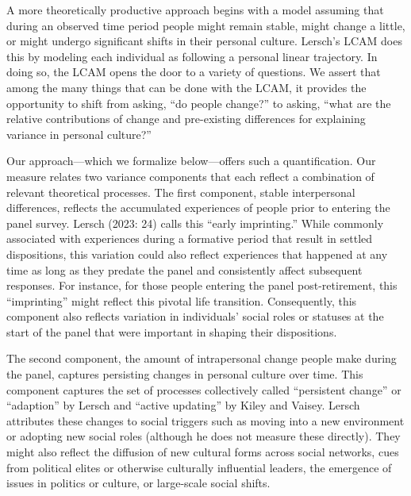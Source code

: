 \documentclass[
  11pt,
]{article}
\begin{document}
A more theoretically productive approach begins with a model assuming
that during an observed time period people might remain stable, might
change a little, or might undergo significant shifts in their personal
culture. Lersch's LCAM does this by modeling each individual as
following a personal linear trajectory. In doing so, the LCAM opens the
door to a variety of questions. We assert that among the many things
that can be done with the LCAM, it provides the opportunity to shift
from asking, ``do people change?'' to asking, ``what are the relative
contributions of change and pre-existing differences for explaining
variance in personal culture?''

Our approach---which we formalize below---offers such a quantification.
Our measure relates two variance components that each reflect a
combination of relevant theoretical processes. The first component,
stable interpersonal differences, reflects the accumulated experiences
of people prior to entering the panel survey. Lersch (2023: 24) calls
this ``early imprinting.'' While commonly associated with experiences
during a formative period that result in settled dispositions, this
variation could also reflect experiences that happened at any time as
long as they predate the panel and consistently affect subsequent
responses. For instance, for those people entering the panel
post-retirement, this ``imprinting'' might reflect this pivotal life
transition. Consequently, this component also reflects variation in
individuals' social roles or statuses at the start of the panel that
were important in shaping their dispositions.

The second component, the amount of intrapersonal change people make
during the panel, captures persisting changes in personal culture over
time. This component captures the set of processes collectively called
``persistent change'' or ``adaption'' by Lersch and ``active updating''
by Kiley and Vaisey. Lersch attributes these changes to social triggers
such as moving into a new environment or adopting new social roles
(although he does not measure these directly). They might also reflect
the diffusion of new cultural forms across social networks, cues from
political elites or otherwise culturally influential leaders, the
emergence of issues in politics or culture, or large-scale social
shifts.
\end{document}
